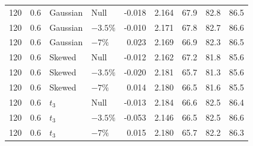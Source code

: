 \begin{table}[H]
\begin{tabular*}{\textwidth}{@{\extracolsep{\fill}}rrllrrrrr}
120 & 0.6 & Gaussian & Null & -0.018 & 2.164 & 67.9 & 82.8 & 86.5 \\
120 & 0.6 & Gaussian & $-3.5\%$ & -0.010 & 2.171 & 67.8 & 82.7 & 86.6 \\
120 & 0.6 & Gaussian & $-7\%$ & 0.023 & 2.169 & 66.9 & 82.3 & 86.5 \\
120 & 0.6 & Skewed & Null & -0.012 & 2.162 & 67.2 & 81.8 & 85.6 \\
120 & 0.6 & Skewed & $-3.5\%$ & -0.020 & 2.181 & 65.7 & 81.3 & 85.6 \\
120 & 0.6 & Skewed & $-7\%$ & 0.014 & 2.180 & 66.5 & 81.6 & 85.5 \\
120 & 0.6 & $t_3$ & Null & -0.013 & 2.184 & 66.6 & 82.5 & 86.4 \\
120 & 0.6 & $t_3$ & $-3.5\%$ & -0.053 & 2.146 & 66.5 & 82.5 & 86.6 \\
120 & 0.6 & $t_3$ & $-7\%$ & 0.015 & 2.180 & 65.7 & 82.2 & 86.3 \\
\bottomrule
\end{tabular*}
\end{table}



